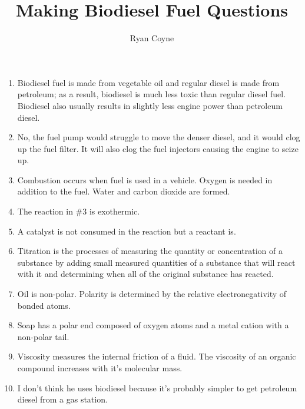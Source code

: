 \documentclass[12pt]{article}
\begin{document}
    \title{Making Biodiesel Fuel Questions}
    \author{Ryan Coyne}
    \maketitle
    \begin{enumerate}
        \item Biodiesel fuel is made from vegetable oil and regular diesel is made from petroleum; as a result, biodiesel is much less toxic than regular diesel fuel. Biodiesel also usually results in slightly less engine power than petroleum diesel.
        \item No, the fuel pump would struggle to move the denser diesel, and it would clog up the fuel filter. It will also clog the fuel injectors causing the engine to seize up.
        \item Combustion occurs when fuel is used in a vehicle. Oxygen is needed in addition to the fuel. Water and carbon dioxide are formed.
        \item The reaction in \#3 is exothermic.
        \item A catalyst is not consumed in the reaction but a reactant is.
        \item Titration is the processes of measuring the quantity or concentration of a substance by adding small measured quantities of a substance that will react with it and determining when all of the original substance has reacted.
        \item Oil is non-polar. Polarity is determined by the relative electronegativity of bonded atoms.
        \item Soap has a polar end composed of oxygen atoms and a metal cation with a non-polar tail.
        \item Viscosity measures the internal friction of a fluid. The viscosity of an organic compound increases with it's molecular mass.
        \item I don't think he uses biodiesel because it's probably simpler to get petroleum diesel from a gas station.
    \end{enumerate}
\end{document}
